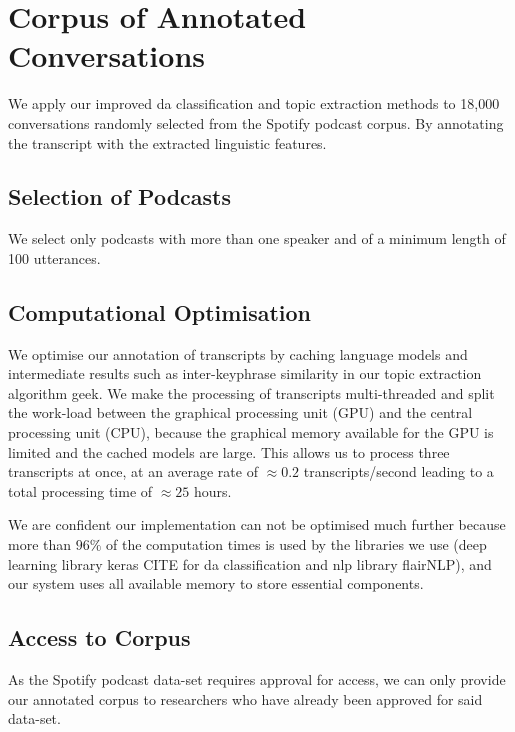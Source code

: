 {\let\clearpage\relax \chapter[Annotated Corpus]{Corpus of Annotated Conversations}}

We apply our improved \gls{da} classification and topic extraction methods to 18,000 conversations randomly selected from the Spotify podcast corpus\cite{clifton-2020100000}. By annotating the transcript with the extracted linguistic features.

\section{Selection of Podcasts}
We select only podcasts with more than one speaker and of a minimum length of 100 \glspl{utterance}.

\section{Computational Optimisation}
We optimise our annotation of transcripts by caching language \glspl{model} and intermediate results such as inter-\gls{keyphrase} similarity in our topic extraction algorithm \gls{geek}.
We make the processing of transcripts multi-threaded and split the work-load between the graphical processing unit (GPU) and the central processing unit (CPU), because the graphical memory available for the GPU is limited and the cached \glspl{model} are large. This allows us to process three transcripts at once, at an average rate of $\approx 0.2$ transcripts/second leading to a total processing time of $\approx 25$ hours.

We are confident our implementation can not be optimised much further because more than $96\%$ of the computation times is used by the libraries we use (deep learning library keras CITE for \gls{da} classification and \gls{nlp} library flairNLP\cite{flairNLP}), and our system uses all available memory to store essential components.

\section{Access to Corpus}

As the Spotify podcast data-set requires approval for access, we can only provide our annotated corpus to researchers who have already been approved for said data-set. \newline
